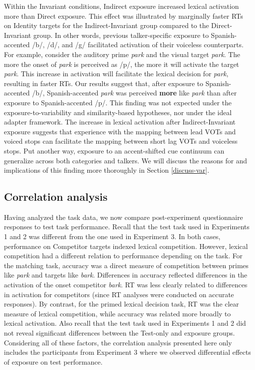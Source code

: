 \documentclass[
  12pt,
  twoside]{article}
\begin{document}
Within the Invariant conditions, Indirect exposure increased lexical activation more than Direct exposure.
This effect was illustrated by marginally faster RTs on Identity targets for the Indirect-Invariant group compared to the Direct-Invariant group.
In other words, previous talker-specific exposure to Spanish-accented /b/, /d/, and /g/ facilitated activation of their voiceless counterparts.
For example, consider the auditory prime \emph{park} and the visual target \emph{park}.
The more the onset of \emph{park} is perceived as /p/, the more it will activate the target \emph{park}.
This increase in activation will facilitate the lexical decision for \emph{park}, resulting in faster RTs.
Our results suggest that, after exposure to Spanish-accented /b/, Spanish-accented \emph{park} was perceived \textbf{more} like \emph{park} than after exposure to Spanish-accented /p/.
This finding was not expected under the exposure-to-variability and similarity-based hypotheses, nor under the ideal adapter framework.
The increase in lexical activation after Indirect-Invariant exposure suggests that experience with the mapping between lead VOTs and voiced stops can facilitate the mapping between short lag VOTs and voiceless stops.
Put another way, exposure to an accent-shifted cue continuum can generalize across both categories and talkers.
We will discuss the reasons for and implications of this finding more thoroughly in Section \ref{discuss-var}.

\hypertarget{corr-intro}{%
\subsection{Correlation analysis}\label{corr-intro}}

Having analyzed the task data, we now compare post-experiment questionnaire responses to test task performance.
Recall that the test task used in Experiments 1 and 2 was different from the one used in Experiment 3.
In both cases, performance on Competitor targets indexed lexical competition.
However, lexical competition had a different relation to performance depending on the task.
For the matching task, accuracy was a direct measure of competition between primes like \emph{park} and targets like \emph{bark}.
Differences in accuracy reflected differences in the activation of the onset competitor \emph{bark}.
RT was less clearly related to differences in activation for competitors (since RT analyses were conducted on accurate responses).
By contrast, for the primed lexical decision task, RT was the clear measure of lexical competition, while accuracy was related more broadly to lexical activation.
Also recall that the test task used in Experiments 1 and 2 did not reveal significant differences between the Test-only and exposure groups.
Considering all of these factors, the correlation analysis presented here only includes the participants from Experiment 3 where we observed differential effects of exposure on test performance.
\end{document}

